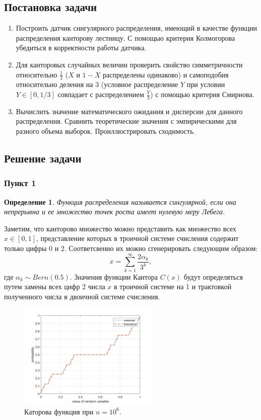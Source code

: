 \documentclass[oneside, final, 12pt]{article}
\newtheorem{definition}{Определение}
\begin{document}
\subsection{Постановка задачи}
    \begin{enumerate} 
        \item Построить датчик сингулярного распределения, имеющий в качестве функции распределения
	 	канторову лестницу. С помощью критерия Колмогорова убедиться в корректности работы датчика. 
        \item Для канторовых случайных величин проверить свойство симметричности относительно 
			$\frac{1}{2}$ ($X$ и $1-X$ распределены одинаково) и самоподобия относительно деления 
			на $3$ (условное распределение $Y$ при условии $Y \in [0,1/3]$ совпадает 
			с распределением $\frac{Y}{3}$) с помощью критерия Смирнова.
        \item Вычислить значение математического ожидания и дисперсии для данного распределения.
			Сравнить теоретические значения с эмпирическими для разного объема выборок.
			Проиллюстрировать сходимость.
    \end{enumerate}
\subsection{Решение задачи}
\subsubsection{Пункт 1}
	
	\begin{definition}
		Функция распределения называется сингулярной, если она непрерывна и ее множество
		точек роста имеет нулевую меру Лебега.
	\end{definition}
	Заметим, что канторово множество можно представить как множество всех $x \in [0, 1]$,
	представление которых в троичной системе счисления содержит только цифры 0 и 2.
	Соответсвенно их можно сгенерировать следующим образом:
	$$
		x = \sum\limits_{k=1}^{\infty} \dfrac{2 \alpha_k}{3^k},
	$$
	где $\alpha_k \sim Bern(0.5)$. Значения функции Кантора $C(x)$ будут определяться
	путем замены всех цифр 2 числа $x$ в троичной системе на 1 
	и трактовкой полученного числа в двоичной системе счисления.
	\begin{figure}[h!]
		\centering
		\includegraphics[width=0.6\textwidth]{../code/Task_2/pict/cant_vis_ex.png}
		\caption{Каторова функция при $n=10^6$. }
    \end{figure}
	
\end{document}
